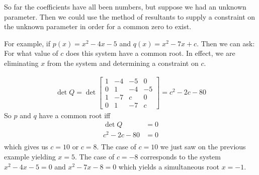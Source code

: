 \begin{numerical-example}
  So far the coefficients have all been numbers, but suppose we had an
  unknown parameter. Then we could use the method of resultants to
  supply a constraint on the unknown parameter in order for a common
  zero to exist.

For example, if $p(x) = x^2 - 4x - 5$ and $q(x) = x^2 - 7x + c$. Then
we can ask: For what value of $c$ does this system have a common
root. In effect, we are eliminating $x$ from the system and
determining a constraint on $c$.

\begin{align*}
  \det Q = \det
  \begin{bmatrix}
    1 & -4 & -5 & 0 \\
0 & 1 & -4 & -5 \\
1 & -7 & c & 0 \\
0 & 1 & -7 & c
  \end{bmatrix} = c^2 - 2c - 80
\end{align*}
So $p$ and $q$ have a common root iff
\begin{align*}
  \det Q &= 0 \\
c^2 - 2c - 80 &= 0 \\
\end{align*}
which gives us $c = 10$ or $c = 8$. The case of $c=10$ we just saw on
the previous example yielding $x = 5$. The case of $c = -8$
corresponds to the system $x^2 - 4x - 5 = 0$ and $x^2 - 7x - 8 = 0$
which yields a simultaneous root $x = -1$.
\end{numerical-example}

